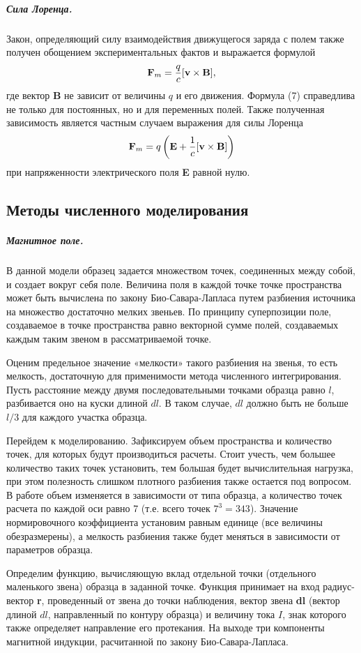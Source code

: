 \documentclass[12pt,a4paper]{article}
\begin{document}
\subparagraph*{Сила Лоренца.}
Закон, определяющий силу взаимодействия движущегося заряда с полем также получен обощением экспериментальных фактов и выражается формулой
\begin{equation}
    \textbf{F}_m = {q \over c}[ \textbf{v} \times \textbf{B}],
\end{equation}
где вектор \textbf{B} не зависит от величины $q$ и его движения.
Формула (7) справедлива не только для постоянных, но и для переменных полей.
Также полученная зависимость является частным случаем выражения для силы Лоренца
\[\textbf{F}_m = q \left(\textbf{E} + {1 \over c} [\textbf{v} \times \textbf{B}]\right)\]
при напряженности электрического поля \textbf{E} равной нулю.
\subsection*{Методы численного моделирования}
\subparagraph*{Магнитное поле.}В данной модели образец задается множеством точек, соединенных между собой, и создает вокруг себя поле. 
Величина поля в каждой точке точке пространства может быть вычислена по закону Био-Савара-Лапласа путем разбиения источника на множество достаточно мелких звеньев.
По принципу суперпозиции поле, создаваемое в точке пространства равно векторной сумме полей, создаваемых каждым таким звеном в рассматриваемой точке.

Оценим предельное значение «мелкости» такого разбиения на звенья, то есть мелкость, достаточную для применимости метода численного интегрирования.
Пусть расстояние между двумя последовательными точками образца равно $l$, разбивается оно на куски длиной $dl$. 
В таком случае, $dl$ должно быть не больше $l/3$ для каждого участка образца. 

Перейдем к моделированию. 
Зафиксируем объем пространства и количество точек, для которых будут производиться расчеты. 
Стоит учесть, чем большее количество таких точек установить, тем большая будет вычислительная нагрузка, при этом полезность слишком плотного разбиения также остается под вопросом.
В работе объем изменяется в зависимости от типа образца, а количество точек расчета по каждой оси равно 7 (т.е. всего точек $7^3=343$).
Значение нормировочного коэффициента установим равным единице (все величины обезразмерены), а мелкость разбиения также будет меняться в зависимости от параметров образца.

Определим функцию, вычисляющую вклад отдельной точки (отдельного маленького звена) образца в заданной точке. 
Функция принимает на вход радиус-вектор \textbf{r}, проведенный от звена до точки наблюдения, вектор звена \textbf{dl} (вектор длиной $dl$, направленный по контуру образца) и величину тока $I$, знак которого также определяет направление его протекания. 
На выходе три компоненты магнитной индукции, расчитанной по закону Био-Савара-Лапласа.
\end{document}
